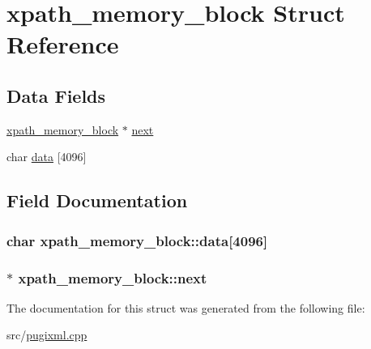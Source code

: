 \hypertarget{structxpath__memory__block}{
\section{xpath\_\-memory\_\-block Struct Reference}
\label{structxpath__memory__block}
}
\subsection*{Data Fields}
\begin{DoxyCompactItemize}
\item 
\hyperlink{structxpath__memory__block}{xpath\_\-memory\_\-block} $\ast$ \hyperlink{structxpath__memory__block_ab7f0d8400b40a51cdb063e76fd19a93c}{next}
\item 
char \hyperlink{structxpath__memory__block_a7b00376d0eac172ab537b6b0964858a9}{data} \mbox{[}4096\mbox{]}
\end{DoxyCompactItemize}


\subsection{Field Documentation}
\hypertarget{structxpath__memory__block_a7b00376d0eac172ab537b6b0964858a9}{
\subsubsection[{data}]{\setlength{\rightskip}{0pt plus 5cm}char {\bf xpath\_\-memory\_\-block::data}\mbox{[}4096\mbox{]}}}
\label{structxpath__memory__block_a7b00376d0eac172ab537b6b0964858a9}
\hypertarget{structxpath__memory__block_ab7f0d8400b40a51cdb063e76fd19a93c}{
\subsubsection[{next}]{$\ast$ {\bf xpath\_\-memory\_\-block::next}}}
\label{structxpath__memory__block_ab7f0d8400b40a51cdb063e76fd19a93c}


The documentation for this struct was generated from the following file:\begin{DoxyCompactItemize}
\item 
src/\hyperlink{pugixml_8cpp}{pugixml.cpp}\end{DoxyCompactItemize}
